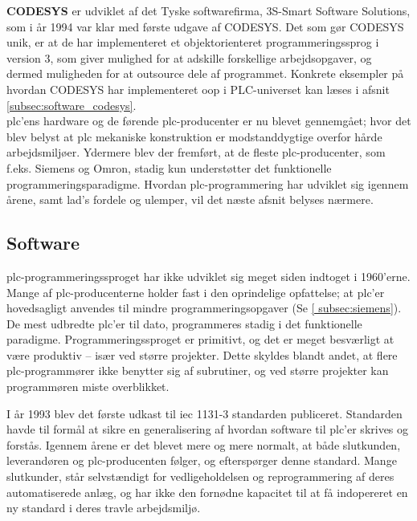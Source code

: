 \label{subsec:codesys}
\noindent\textbf{CODESYS} er udviklet af det Tyske softwarefirma, 3S-Smart Software Solutions, som i år 1994 var klar med første udgave af CODESYS. Det som gør CODESYS unik, er at de har implementeret et objektorienteret programmeringssprog i version 3, som giver mulighed for at adskille forskellige arbejdsopgaver, og dermed muligheden for at outsource dele af programmet. Konkrete eksempler på hvordan CODESYS har implementeret \gls{oop} i PLC-universet kan læses i afsnit \ref{subsec:software_codesys}. \\

\noindent \gls{plc}'ens hardware og de førende \gls{plc}-producenter er nu blevet gennemgået; hvor det blev belyst at \gls{plc} mekaniske konstruktion er modstanddygtige overfor hårde arbejdsmiljøer. Ydermere blev der fremført, at de fleste \gls{plc}-producenter, som f.eks. Siemens og Omron, stadig kun understøtter det funktionelle programmeringsparadigme. 
Hvordan \gls{plc}-programmering har udviklet sig igennem årene, samt \gls{lad}'s fordele og ulemper, vil det næste afsnit belyses nærmere.

\subsection{Software}
\gls{plc}-programmeringssproget har ikke udviklet sig meget siden indtoget i 1960'erne. 
Mange af \gls{plc}-producenterne holder fast i den oprindelige opfattelse; at \gls{plc}'er hovedsagligt anvendes til mindre programmeringsopgaver (Se \ref{ subsec:siemens}). De mest udbredte \gls{plc}'er til dato, programmeres stadig i det funktionelle paradigme. Programmeringssproget er primitivt, og det er meget besværligt at være produktiv – især ved større projekter. Dette skyldes blandt andet, at flere \gls{plc}-programmører ikke benytter sig af subrutiner, og ved større projekter kan programmøren miste overblikket. 

I år 1993 blev det første udkast til \gls{iec} 1131-3 standarden publiceret\cite{iecStandard}. Standarden havde til formål at sikre en generalisering af hvordan software til \gls{plc}'er skrives og forstås. Igennem årene er det blevet mere og mere normalt, at både slutkunden, leverandøren og \gls{plc}-producenten følger, og efterspørger denne standard. Mange slutkunder, står selvstændigt for vedligeholdelsen og reprogrammering af deres automatiserede anlæg, og har ikke den fornødne kapacitet til at få indopereret en ny standard i deres travle arbejdsmiljø. \\

